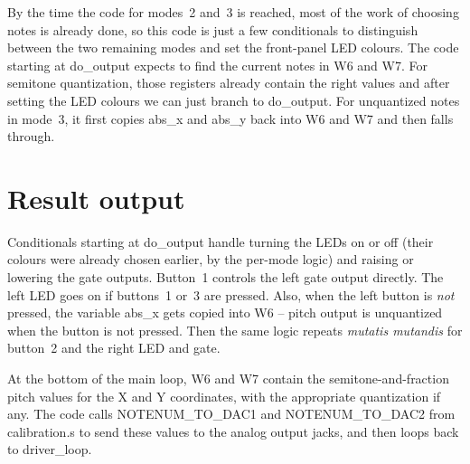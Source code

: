 By the time the code for modes~2 and~3 is reached, most of the work of
choosing notes is already done, so this code is just a few conditionals to
distinguish between the two remaining modes and set the front-panel LED
colours.  The code starting at do\_output expects to find the current notes
in W6 and W7.  For semitone quantization, those registers already contain
the right values and after setting the LED colours we can just branch to
do\_output.  For unquantized notes in mode~3, it first copies abs\_x and
abs\_y back into W6 and W7 and then falls through.

\section{Result output}

Conditionals starting at do\_output handle turning the LEDs on or off (their
colours were already chosen earlier, by the per-mode logic) and raising or
lowering the gate outputs.  Button~1 controls the left gate output directly. 
The left LED goes on if buttons~1 or~3 are pressed.  Also, when the left
button is \emph{not} pressed, the variable abs\_x gets copied into W6 --
pitch output is unquantized when the button is not pressed.  Then the same
logic repeats \emph{mutatis mutandis} for button~2 and the right LED and
gate.

At the bottom of the main loop, W6 and W7 contain the semitone-and-fraction
pitch values for the X and Y coordinates, with the appropriate quantization
if any.  The code calls NOTENUM\_TO\_DAC1 and NOTENUM\_TO\_DAC2 from
calibration.s to send these values to the analog output jacks, and then
loops back to driver\_loop.
